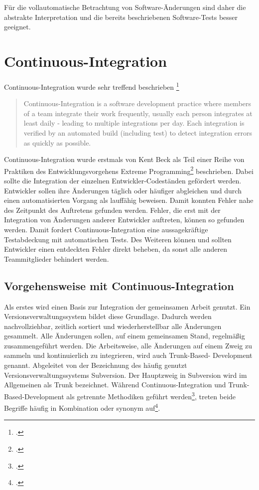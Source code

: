 \vspace{1em}

Für die vollautomatische Betrachtung von Software-Änderungen sind daher die abstrakte Interpretation und die bereits beschriebenen Software-Tests besser geeignet. 

\section{Continuous-Integration}

Continuous-Integration wurde sehr treffend beschrieben \footcite[vgl.][]{fowler2006}

\blockquote {Continuous-Integration is a software development practice where members of a team integrate their work frequently, usually each person integrates at least daily - leading to multiple integrations per day. Each integration is verified by an automated build (including test) to detect integration errors as quickly as possible.}

Continuous-Integration wurde erstmals von Kent Beck als Teil einer Reihe von Praktiken des Entwicklungsvorgehens \glqq Extreme Programming\grqq{}\footcite[vgl.][]{kent1999} beschrieben. Dabei sollte die Integration der einzelnen Entwickler-Codeständen gefördert werden. Entwickler sollen ihre Änderungen täglich oder häufiger abgleichen und durch einen automatisierten Vorgang als lauffähig beweisen. Damit konnten Fehler nahe des Zeitpunkt des Auftretens gefunden werden. Fehler, die erst mit der Integration von Änderungen anderer Entwickler auftreten, können so gefunden werden. Damit fordert Continuous-Integration eine aussagekräftige Testabdeckung mit automatischen Tests. Des Weiteren können und sollten Entwickler einen entdeckten Fehler direkt beheben, da sonst alle anderen Teammitglieder behindert werden.

\subsection{Vorgehensweise mit Continuous-Integration}

Als erstes wird einen Basis zur Integration der gemeinsamen Arbeit genutzt. Ein Versionsverwaltungssystem bildet diese Grundlage. Dadurch werden nachvollziehbar, zeitlich sortiert und wiederherstellbar alle Änderungen gesammelt. Alle Änderungen sollen, auf einem gemeinsamen Stand, regelmäßig zusammengeführt werden. Die Arbeitsweise, alle Änderungen auf einem Zweig zu sammeln und kontinuierlich zu integrieren, wird auch Trunk-Based-
Development genannt. Abgeleitet von der Bezeichnung des häufig genutzt Versionsverwaltungssystems Subversion. Der Hauptzweig in Subversion wird im Allgemeinen als \glqq Trunk\grqq{} bezeichnet. Während Continuous-Integration und Trunk-Based-Development als getrennte Methodiken geführt werden\footcite[vgl.][]{trunkbaseddevelopment}, treten beide Begriffe häufig in Kombination oder synonym auf\footcite[vgl.][]{fowler-feature-branch}.

